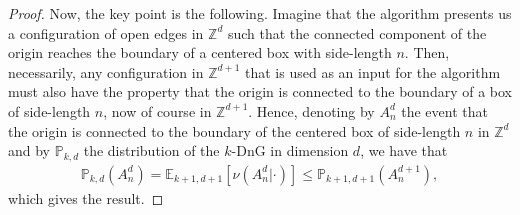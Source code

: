\documentclass[oneside]{amsart}
\theoremstyle{definition}
\renewcommand{\P}{\mathbb{P}}
\newcommand{\1}{\mathbbm{1}}
\newcommand{\E}{\mathbb{E}}
\newcommand{\0}{\mathbf{o}}
\newcommand{\Z}{\mathbb{Z}}
\numberwithin{equation}{section}
\begin{document}
\begin{proof}
Now, the key point is the following. Imagine that the algorithm presents us a configuration of open edges in $\Z^d$ such that the connected component of the origin reaches the boundary of a centered box with side-length $n$. Then, necessarily, any configuration in $\Z^{d+1}$ that is used as an input for the algorithm must also have the property that the origin is connected to the boundary of a box of side-length $n$, now of course in  $\Z^{d+1}$. Hence, denoting by $A^{d}_n$ the event that the origin is connected to the boundary of the centered box of side-length $n$ in $\Z^d$ and by $\P_{k,d}$ the distribution of the $k$-DnG in dimension $d$, we have that 
\begin{align*}
\P_{k,d}(A^d_n)=\E_{k+1,d+1}[\nu(A^d_n|\cdot)]\le \P_{k+1,d+1}(A^{d+1}_n), 
\end{align*}
which gives the result.

\end{proof}
\end{document}
